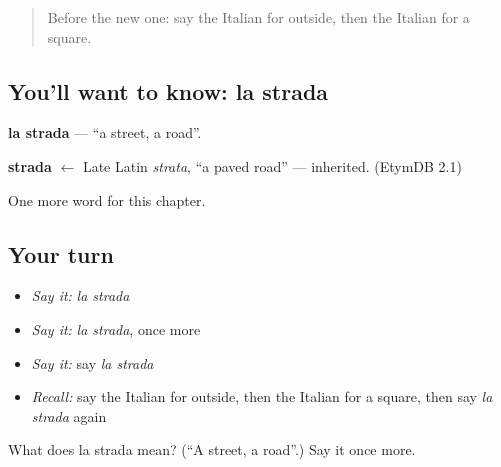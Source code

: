 \begin{quote}
Before the new one: say the Italian for outside, then the Italian for a square.
\end{quote}

\subsection*{You'll want to know: la strada}
\textbf{la strada} — \textquotedblleft{}a street, a road\textquotedblright{}.

\begin{cousinweb}
\textbf{strada} $\leftarrow$ Late Latin \emph{strata}, \textquotedblleft{}a paved road\textquotedblright{} — inherited. (EtymDB 2.1)
\end{cousinweb}

\begin{grammarlens}[title={What you've built}]
One more word for this chapter.
\end{grammarlens}

\subsection*{Your turn}
\begin{itemize}
\raggedright
  \item \emph{Say it:} \emph{la strada}
  \item \emph{Say it:} \emph{la strada}, once more
  \item \emph{Say it:} say \emph{la strada}
  \item \emph{Recall:} say the Italian for outside, then the Italian for a square, then say \emph{la strada} again
\end{itemize}

\begin{tcolorbox}[breakable,colback=teal!4,colframe=teal!35!black,title={Before you move on}]
What does la strada mean? (\textquotedblleft{}A street, a road\textquotedblright{}.) Say it once more.
\end{tcolorbox}
